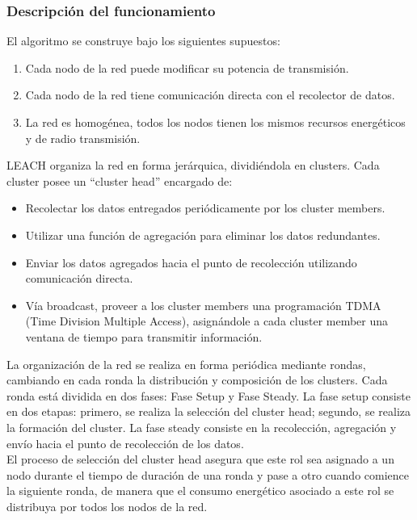 
\subsubsection{Descripción del funcionamiento}
El algoritmo se construye bajo los siguientes supuestos:
\begin{enumerate}
 \item Cada nodo de la red puede modificar su potencia de transmisión.
 \item Cada nodo de la red tiene comunicación directa con el recolector de datos.
 \item La red es homogénea, todos los nodos tienen los mismos recursos energéticos y de radio transmisión.
\end{enumerate}

LEACH organiza la red en forma jerárquica, dividiéndola en clusters. Cada cluster posee un ``cluster head'' encargado de:

\begin{itemize}
 \item Recolectar los datos entregados periódicamente por los cluster members.
 \item Utilizar una función de agregación para eliminar los datos redundantes.
 \item Enviar los datos agregados hacia el punto de recolección utilizando comunicación directa.
 \item Vía broadcast, proveer a los cluster members una programación TDMA (Time Division Multiple Access), asignándole a cada cluster member una ventana de tiempo para transmitir información.
\end{itemize}

La organización de la red se realiza en forma periódica mediante rondas, cambiando en cada ronda la distribución y composición de los clusters. Cada ronda está dividida en dos fases: Fase Setup y Fase Steady. La fase setup consiste en dos etapas: primero, se realiza la selección del cluster head; segundo, se realiza la formación del cluster. La fase steady consiste en la recolección, agregación y envío hacia el punto de recolección de los datos.\\

El proceso de selección del cluster head asegura que este rol sea asignado  a un nodo durante el tiempo de duración de una ronda y pase a otro cuando comience la siguiente ronda, de manera que el consumo energético asociado a este rol se distribuya por todos los nodos de la red.\\

